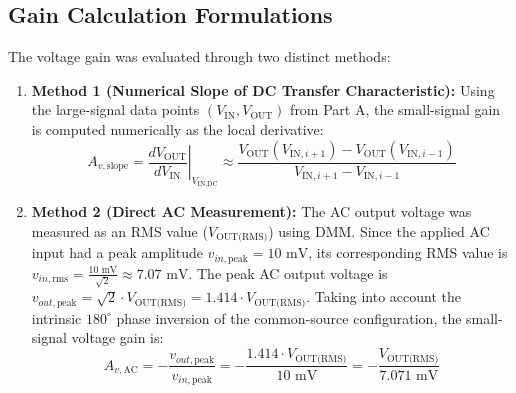 \documentclass[11pt,a4paper]{article}
\begin{document}
\subsection{Gain Calculation Formulations}
The voltage gain was evaluated through two distinct methods:
\begin{enumerate}
    \item \textbf{Method 1 (Numerical Slope of DC Transfer Characteristic):}
    Using the large-signal data points $(V_{\text{IN}}, V_{\text{OUT}})$ from Part A, the small-signal gain is computed numerically as the local derivative:
    \begin{equation}
        A_{v,\text{slope}} = \left. \frac{dV_{\text{OUT}}}{dV_{\text{IN}}} \right|_{V_{\text{IN,DC}}} \approx \frac{V_{\text{OUT}}(V_{\text{IN},i+1}) - V_{\text{OUT}}(V_{\text{IN},i-1})}{V_{\text{IN},i+1} - V_{\text{IN},i-1}}
    \end{equation}
    \item \textbf{Method 2 (Direct AC Measurement):}
    The AC output voltage was measured as an RMS value ($V_{\text{OUT(RMS)}}$) using DMM. Since the applied AC input had a peak amplitude $v_{in,\text{peak}} = 10\text{ mV}$, its corresponding RMS value is $v_{in,\text{rms}} = \frac{10\text{ mV}}{\sqrt{2}} \approx 7.07\text{ mV}$. The peak AC output voltage is $v_{out,\text{peak}} = \sqrt{2} \cdot V_{\text{OUT(RMS)}} = 1.414 \cdot V_{\text{OUT(RMS)}}$. Taking into account the intrinsic $180^\circ$ phase inversion of the common-source configuration, the small-signal voltage gain is:
    \begin{equation}
        A_{v,\text{AC}} = -\frac{v_{out,\text{peak}}}{v_{in,\text{peak}}} = -\frac{1.414 \cdot V_{\text{OUT(RMS)}}}{10\text{ mV}} = -\frac{V_{\text{OUT(RMS)}}}{7.071\text{ mV}}
    \end{equation}
\end{enumerate}
\end{document}
